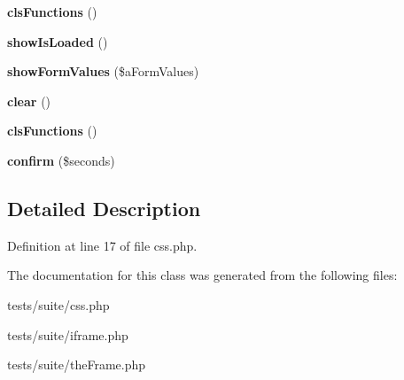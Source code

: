 \begin{DoxyCompactItemize}
\item 
\hypertarget{classclsFunctions_ae44809d49334b5c385b7fd4b1e0d195c}{
{\bfseries clsFunctions} ()}
\label{classclsFunctions_ae44809d49334b5c385b7fd4b1e0d195c}

\item 
\hypertarget{classclsFunctions_a0bd6dd64bf2bcdf6cba5d3de8edd5f02}{
{\bfseries showIsLoaded} ()}
\label{classclsFunctions_a0bd6dd64bf2bcdf6cba5d3de8edd5f02}

\item 
\hypertarget{classclsFunctions_a6be142ebcc35e929ecac5dbf84db4863}{
{\bfseries showFormValues} (\$aFormValues)}
\label{classclsFunctions_a6be142ebcc35e929ecac5dbf84db4863}

\item 
\hypertarget{classclsFunctions_af56ddbe38a38dc9dcf88bdd3b0a89887}{
{\bfseries clear} ()}
\label{classclsFunctions_af56ddbe38a38dc9dcf88bdd3b0a89887}

\item 
\hypertarget{classclsFunctions_ae44809d49334b5c385b7fd4b1e0d195c}{
{\bfseries clsFunctions} ()}
\label{classclsFunctions_ae44809d49334b5c385b7fd4b1e0d195c}

\item 
\hypertarget{classclsFunctions_a225ea1cc121fb89698bc2839ae8decc6}{
{\bfseries confirm} (\$seconds)}
\label{classclsFunctions_a225ea1cc121fb89698bc2839ae8decc6}

\end{DoxyCompactItemize}


\subsection{Detailed Description}


Definition at line 17 of file css.php.



The documentation for this class was generated from the following files:\begin{DoxyCompactItemize}
\item 
tests/suite/css.php\item 
tests/suite/iframe.php\item 
tests/suite/theFrame.php\end{DoxyCompactItemize}
